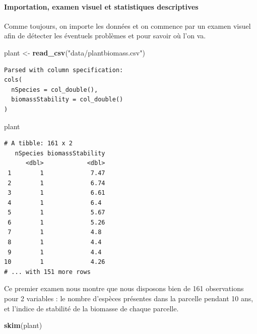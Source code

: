 \documentclass[a4paperpaper,]{article}
\newenvironment{Shaded}{\begin{snugshade}}{\end{snugshade}}
\newcommand{\KeywordTok}[1]{\textcolor[rgb]{0.12,0.11,0.11}{\textbf{#1}}}
\newcommand{\NormalTok}[1]{\textcolor[rgb]{0.12,0.11,0.11}{#1}}
\newcommand{\StringTok}[1]{\textcolor[rgb]{0.75,0.01,0.01}{#1}}
\let\oldparagraph\paragraph
\renewcommand{\paragraph}[1]{\oldparagraph{#1}\mbox{}}
\begin{document}
\hypertarget{importation-examen-visuel-et-statistiques-descriptives}{%
\paragraph{Importation, examen visuel et statistiques descriptives}\label{importation-examen-visuel-et-statistiques-descriptives}}

Comme toujours, on importe les données et on commence par un examen visuel afin de détecter les éventuels problèmes et pour savoir où l'on va.

\begin{Shaded}
\begin{Highlighting}[]
\NormalTok{plant <-}\StringTok{ }\KeywordTok{read_csv}\NormalTok{(}\StringTok{"data/plantbiomass.csv"}\NormalTok{)}
\end{Highlighting}
\end{Shaded}

\begin{verbatim}
Parsed with column specification:
cols(
  nSpecies = col_double(),
  biomassStability = col_double()
)
\end{verbatim}

\begin{Shaded}
\begin{Highlighting}[]
\NormalTok{plant}
\end{Highlighting}
\end{Shaded}

\begin{verbatim}
# A tibble: 161 x 2
   nSpecies biomassStability
      <dbl>            <dbl>
 1        1             7.47
 2        1             6.74
 3        1             6.61
 4        1             6.4 
 5        1             5.67
 6        1             5.26
 7        1             4.8 
 8        1             4.4 
 9        1             4.4 
10        1             4.26
# ... with 151 more rows
\end{verbatim}

Ce premier examen nous montre que nous disposons bien de 161 observations pour 2 variables : le nombre d'espèces présentes dans la parcelle pendant 10 ans, et l'indice de stabilité de la biomasse de chaque parcelle.

\begin{Shaded}
\begin{Highlighting}[]
\KeywordTok{skim}\NormalTok{(plant)}
\end{Highlighting}
\end{Shaded}
\end{document}

